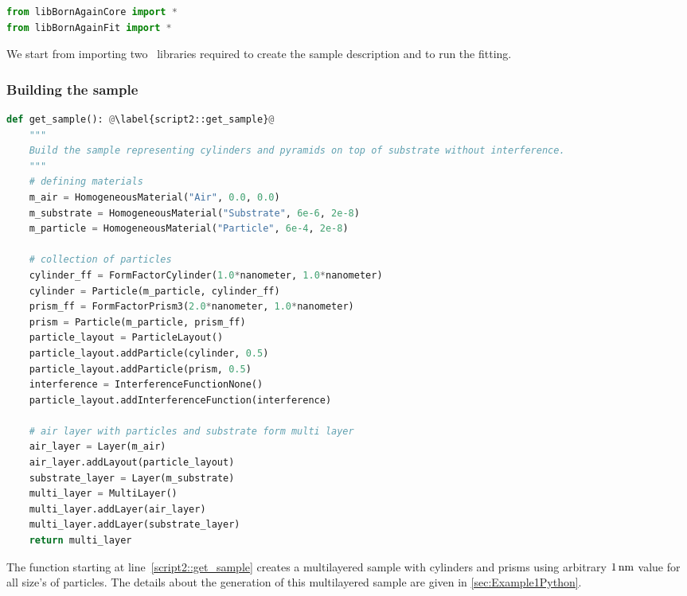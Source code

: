 \begin{lstlisting}[language=python, style=eclipseboxed]
from libBornAgainCore import *
from libBornAgainFit import *
\end{lstlisting}
We start from importing two \BornAgain\ libraries required to create
the sample description
and to run the fitting.

\subsubsection*{Building the sample}

\begin{lstlisting}[language=python, style=eclipseboxed, firstnumber=5]
def get_sample(): @\label{script2::get_sample}@
    """
    Build the sample representing cylinders and pyramids on top of substrate without interference.
    """
    # defining materials
    m_air = HomogeneousMaterial("Air", 0.0, 0.0)
    m_substrate = HomogeneousMaterial("Substrate", 6e-6, 2e-8)
    m_particle = HomogeneousMaterial("Particle", 6e-4, 2e-8)

    # collection of particles
    cylinder_ff = FormFactorCylinder(1.0*nanometer, 1.0*nanometer)
    cylinder = Particle(m_particle, cylinder_ff)
    prism_ff = FormFactorPrism3(2.0*nanometer, 1.0*nanometer)
    prism = Particle(m_particle, prism_ff)
    particle_layout = ParticleLayout()
    particle_layout.addParticle(cylinder, 0.5)
    particle_layout.addParticle(prism, 0.5)
    interference = InterferenceFunctionNone()
    particle_layout.addInterferenceFunction(interference)

    # air layer with particles and substrate form multi layer
    air_layer = Layer(m_air)
    air_layer.addLayout(particle_layout)
    substrate_layer = Layer(m_substrate)
    multi_layer = MultiLayer()
    multi_layer.addLayer(air_layer)
    multi_layer.addLayer(substrate_layer)
    return multi_layer
\end{lstlisting}
The function starting at line~\ref{script2::get_sample} creates a multilayered sample
with cylinders and prisms using arbitrary $1\,{\rm nm}$ value for all size's of particles.
The details about the generation of this multilayered sample are given in \cref{sec:Example1Python}.

